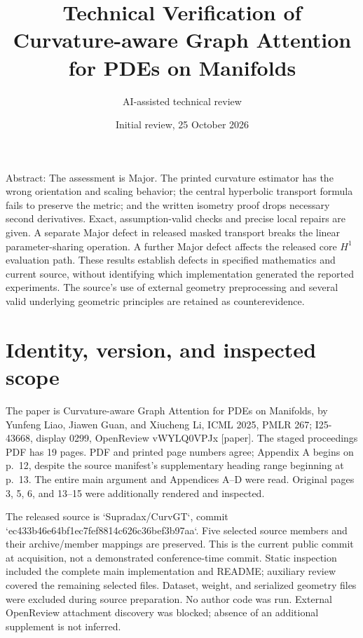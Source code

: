 \documentclass[10pt]{article}
\title{Technical Verification of
Curvature-aware Graph Attention for PDEs on Manifolds}
\author{AI-assisted technical review}
\date{Initial review, 25 October 2026}
\begin{document}
\maketitle
Abstract: The assessment is Major. The printed curvature estimator has the wrong orientation and scaling behavior; the central hyperbolic transport formula fails to preserve the metric; and the written isometry proof drops necessary second derivatives. Exact, assumption-valid checks and precise local repairs are given. A separate Major defect in released masked transport breaks the linear parameter-sharing operation. A further Major defect affects the released core \(H^1\) evaluation path. These results establish defects in specified mathematics and current source, without identifying which implementation generated the reported experiments. The source’s use of external geometry preprocessing and several valid underlying geometric principles are retained as counterevidence.\par
\section*{Identity, version, and inspected scope}
The paper is Curvature-aware Graph Attention for PDEs on Manifolds, by Yunfeng Liao, Jiawen Guan, and Xiucheng Li, ICML 2025, PMLR 267; I25-43668, display 0299, OpenReview vWYLQ0VPJx [paper]. The staged proceedings PDF has 19 pages. PDF and printed page numbers agree; Appendix A begins on p. 12, despite the source manifest’s supplementary heading range beginning at p. 13. The entire main argument and Appendices A–D were read. Original pages 3, 5, 6, and 13–15 were additionally rendered and inspected.\par
The released source is `Supradax/CurvGT`, commit `ec433b46e64bf1ec7fef8814c626c36bef3b97aa`. Five selected source members and their archive/member mappings are preserved. This is the current public commit at acquisition, not a demonstrated conference-time commit. Static inspection included the complete main implementation and README; auxiliary review covered the remaining selected files. Dataset, weight, and serialized geometry files were excluded during source preparation. No author code was run. External OpenReview attachment discovery was blocked; absence of an additional supplement is not inferred.\par
\end{document}
